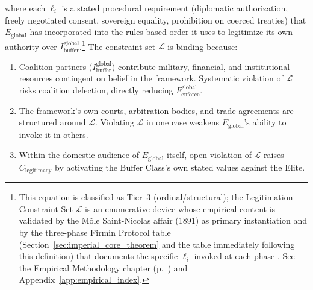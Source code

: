 where each $\ell_i$ is a stated procedural requirement (diplomatic authorization, freely negotiated consent, sovereign equality, prohibition on coerced treaties) that $E_{\text{global}}$ has incorporated into the rules-based order it uses to legitimize its own authority over $I_{\text{buffer}}^{\text{global}}$.\footnote{This equation is classified as Tier~3 (ordinal/structural); the Legitimation Constraint Set $\mathcal{L}$ is an enumerative device whose empirical content is validated by the M\^{o}le Saint-Nicolas affair (1891) as primary instantiation and by the three-phase Firmin Protocol table (Section~\ref{sec:imperial_core_theorem} and the table immediately following this definition) that documents the specific $\ell_i$ invoked at each phase \cite{firmin_legacy, manigat}. See the Empirical Methodology chapter (p.~\pageref{ch:empirical_methodology}) and Appendix~\ref{app:empirical_index}.} The constraint set $\mathcal{L}$ is binding because:
\begin{enumerate}
    \item Coalition partners ($I_{\text{buffer}}^{\text{global}}$) contribute military, financial, and institutional resources contingent on belief in the framework. Systematic violation of $\mathcal{L}$ risks coalition defection, directly reducing $F_{\text{enforce}}^{\text{global}}$.
    \item The framework's own courts, arbitration bodies, and trade agreements are structured around $\mathcal{L}$. Violating $\mathcal{L}$ in one case weakens $E_{\text{global}}$'s ability to invoke it in others.
    \item Within the domestic audience of $E_{\text{global}}$ itself, open violation of $\mathcal{L}$ raises $C_{\text{legitimacy}}$ by activating the Buffer Class's own stated values against the Elite.
\end{enumerate}

